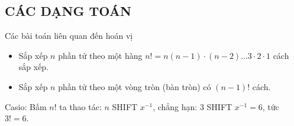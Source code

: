 \subsection{CÁC DẠNG TOÁN}
\setcounter{dang}{0}
\begin{dang}{Các bài toán liên quan đến hoán vị}
	\begin{itemize}
		\item Sắp xếp $n$ phần tử theo một hàng $n!=n(n-1)\cdot(n-2)\ldots3\cdot2\cdot1$ cách sắp xếp.
		\item Sắp xếp $ n $ phần tử theo một vòng tròn (bàn tròn) có $ (n-1)! $ cách. 
	\end{itemize}
	\begin{note} Casio: Bấm $ n! $ ta thao tác: $ n $ SHIFT $ x^{-1} $, chẳng hạn: $ 3 $ SHIFT $ x^{-1}=6 $, tức $ 3!=6 $. 
	\end{note}
\end{dang}
